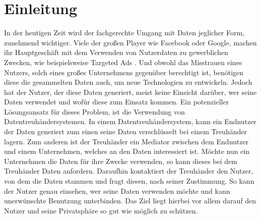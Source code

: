 \documentclass{scrreprt}
\begin{document}
\chapter{Einleitung}
In der heutigen Zeit wird der fachgerechte Umgang mit Daten jeglicher Form, zunehmend wichtiger. Viele der großen Player wie Facebook oder Google, machen ihr Hauptgeschäft mit dem Verwenden von Nutzerdaten zu gewerblichen Zwecken, wie beispielsweise Targeted Ads \cite{facebookad,googlead}. Und obwohl das Misstrauen eines Nutzers, solch eines großes Unternehmens gegenüber berechtigt ist, benötigen diese die gesammelten Daten auch, um neue Technologien zu entwickeln. Jedoch hat der Nutzer, der diese Daten generiert, meist keine Einsicht darüber, wer seine Daten verwendet und wofür diese zum Einsatz kommen. Ein potenzieller Lösungsansatz für dieses Problem, ist die Verwendung von Datentreuhändersystemen. In einem Datentreuhändersystem, kann ein Endnutzer der Daten generiert zum einen seine Daten verschlüsselt bei einem Treuhänder lagern. Zum anderen ist der Treuhänder ein Mediator zwischen dem Endnutzer und einem Unternehmen, welches an den Daten interessiert ist. Möchte nun ein Unternehmen die Daten für ihre Zwecke verwenden, so kann dieses bei dem Treuhänder Daten anfordern. Daraufhin kontaktiert der Treuhänder den Nutzer, von dem die Daten stammen und fragt diesen, nach seiner Zustimmung. So kann der Nutzer genau einsehen, wer seine Daten verwenden möchte und kann unerwünschte Benutzung unterbinden. Das Ziel liegt hierbei vor allem darauf den Nutzer und seine Privatsphäre so gut wie möglich zu schützen.
\end{document}
